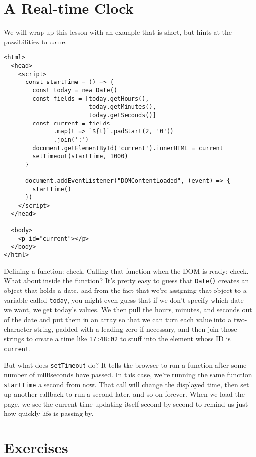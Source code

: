 \section{A Real-time Clock}\label{s:pages-clock}

We will wrap up this lesson with an example that is short,
but hints at the possibilities to come:

\begin{verbatim}
<html>
  <head>
    <script>
      const startTime = () => {
        const today = new Date()
        const fields = [today.getHours(),
                        today.getMinutes(),
                        today.getSeconds()]
        const current = fields
              .map(t => `${t}`.padStart(2, '0'))
              .join(':')
        document.getElementById('current').innerHTML = current
        setTimeout(startTime, 1000)
      }

      document.addEventListener("DOMContentLoaded", (event) => {
        startTime()
      })
    </script>
  </head>

  <body>
    <p id="current"></p>
  </body>
</html>
\end{verbatim}

Defining a function: check.
Calling that function when the DOM is ready: check.
What about inside the function?
It's pretty easy to guess that \texttt{Date()} creates an object that holds a date,
and from the fact that we're assigning that object to a variable called \texttt{today},
you might even guess that if we don't specify which date we want,
we get today's values.
We then pull the hours, minutes, and seconds out of the date and put them in an array
so that we can turn each value into a two-character string,
padded with a leading zero if necessary,
and then join those strings to create a time like \texttt{17:48:02}
to stuff into the element whose ID is \texttt{current}.

But what does \texttt{setTimeout} do?
It tells the browser to run a function after some number of milliseconds have passed.
In this case,
we're running the same function \texttt{startTime} a second from now.
That call will change the displayed time,
then set up another callback to run a second later,
and so on forever.
When we load the page,
we see the current time updating itself second by second
to remind us just how quickly life is passing by.

\section{Exercises}\label{s:pages-exercises}

